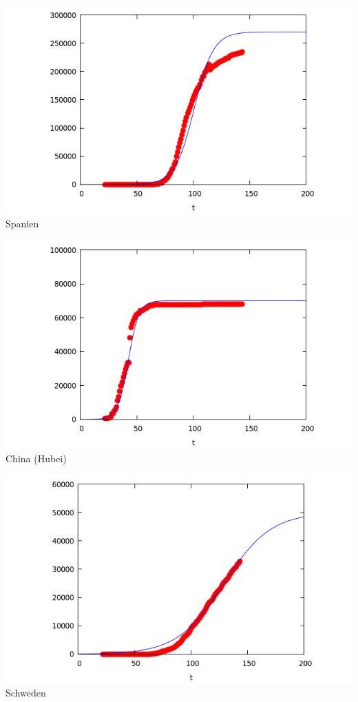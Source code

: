 \documentclass[a4paper,11pt]{article}
\begin{document}
\begin{center}
  \begin{minipage}{.3\textwidth}\centering
    \includegraphics[width=\textwidth]{Spain-2.png}\\[1em] {Spanien}
  \end{minipage}\hfill
  \begin{minipage}{.3\textwidth}\centering
    \includegraphics[width=\textwidth]{China-2.png}\\[1em] {China (Hubei)}
  \end{minipage}\hfill
  \begin{minipage}{.3\textwidth}\centering
    \includegraphics[width=\textwidth]{Sweden-2.png}\\[1em] {Schweden}
  \end{minipage}
\end{center}
\end{document}
